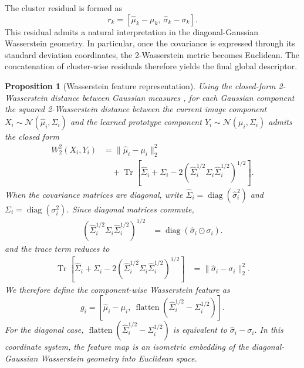 \documentclass[journal]{IEEEtran}
\DeclareMathOperator{\flatten}{flatten}
\newtheorem{proposition}{Proposition}
\begin{document}
The cluster residual is formed as
\begin{equation}
r_k = [\hat{\mu}_k - \mu_k,\ \hat{\sigma}_k - \sigma_k].
\end{equation}
This residual admits a natural interpretation in the diagonal-Gaussian Wasserstein geometry. In particular, once the covariance is expressed through its standard deviation coordinates, the 2-Wasserstein metric becomes Euclidean. The concatenation of cluster-wise residuals therefore yields the final global descriptor.

\begin{proposition}[Wasserstein feature representation]
Using the closed-form 2-Wasserstein distance between Gaussian measures \cite{wgan}, for each Gaussian component the squared 2-Wasserstein distance between the current image component \(X_i \sim \mathcal{N}(\hat{\mu}_i,\hat{\Sigma}_i)\) and the learned prototype component \(Y_i \sim \mathcal{N}(\mu_i,\Sigma_i)\) admits the closed form
\begin{align}
W_2^2(X_i,Y_i)
&= \|\hat{\mu}_i - \mu_i\|_2^2 \nonumber\\
&\quad + \operatorname{Tr}\!\left[\hat{\Sigma}_i + \Sigma_i - 2\left(\hat{\Sigma}_i^{1/2}\Sigma_i\hat{\Sigma}_i^{1/2}\right)^{1/2}\right].
\end{align}
When the covariance matrices are diagonal, write \(\hat{\Sigma}_i = \operatorname{diag}(\hat{\sigma}_i^2)\) and \(\Sigma_i = \operatorname{diag}(\sigma_i^2)\). Since diagonal matrices commute,
\begin{align}
\left(\hat{\Sigma}_i^{1/2}\Sigma_i\hat{\Sigma}_i^{1/2}\right)^{1/2}
&= \operatorname{diag}(\hat{\sigma}_i \odot \sigma_i).
\end{align}
and the trace term reduces to
\begin{align}
\operatorname{Tr}\!\left[\hat{\Sigma}_i + \Sigma_i - 2\left(\hat{\Sigma}_i^{1/2}\Sigma_i\hat{\Sigma}_i^{1/2}\right)^{1/2}\right]
&= \|\hat{\sigma}_i - \sigma_i\|_2^2.
\end{align}
We therefore define the component-wise Wasserstein feature as
\begin{equation}
g_i = [\hat{\mu}_i - \mu_i,\ \flatten(\hat{\Sigma}_i^{1/2} - \Sigma_i^{1/2})].
\end{equation}
For the diagonal case, \(\flatten(\hat{\Sigma}_i^{1/2} - \Sigma_i^{1/2})\) is equivalent to \(\hat{\sigma}_i - \sigma_i\). In this coordinate system, the feature map is an isometric embedding of the diagonal-Gaussian Wasserstein geometry into Euclidean space.

\end{proposition}
\end{document}
